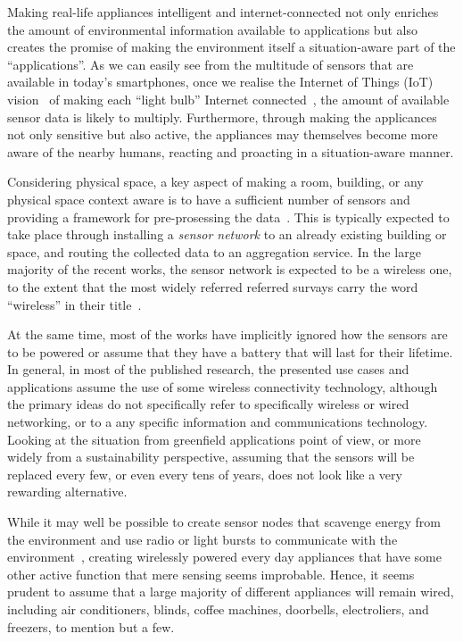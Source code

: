 \documentclass[draft,a4paper]{siamltex}
\begin{document}
Making real-life appliances intelligent and internet-connected not
only enriches the amount of environmental information available to
applications but also creates the promise of making the environment
itself a situation-aware part of the ``applications''.  As we can
easily see from the multitude of sensors that are available in today's
smartphones, once we realise the Internet of Things (IoT)
vision~\cite{Atzori20102787} of making each ``light bulb'' Internet
connected~\cite{cerf1997next}, the amount of available sensor data is
likely to multiply.  Furthermore, through making the applicances not
only sensitive but also active, the appliances may themselves become
more aware of the nearby humans, reacting and proacting in a
situation-aware manner.

Considering physical space, a key aspect of making a room, building,
or any physical space context aware is to have a sufficient number of
sensors and providing a framework for pre-prosessing the
data~\cite{Baldauf2007a}.  This is typically expected to take place
through installing a {\it sensor network} to an already existing
building or space, and routing the collected data to an aggregation
service.  In the large majority of the recent works, the sensor
network is expected to be a wireless one, to the extent that the most
widely referred referred survays carry the word ``wireless'' in their
title~\cite{akyildiz2002wireless, akkaya2005survey}.

At the same time, most of the works have implicitly ignored how the
sensors are to be powered or assume that they have a battery that will
last for their lifetime.  In general, in most of the published
research, the presented use cases and applications assume the use of
some wireless connectivity technology, although the primary ideas do
not specifically refer to specifically wireless or wired networking,
or to a any specific information and communications technology.
Looking at the situation from greenfield applications point of view,
or more widely from a sustainability perspective, assuming that the
sensors will be replaced every few, or even every tens of years, does
not look like a very rewarding alternative.

While it may well be possible to create sensor nodes that scavenge
energy from the environment and use radio or light bursts to
communicate with the environment~\cite{wang2010toward}, creating
wirelessly powered every day appliances that have some other active
function that mere sensing seems improbable.  Hence, it seems prudent
to assume that a large majority of different appliances will remain
wired, including air conditioners, blinds, coffee machines, doorbells,
electroliers, and freezers, to mention but a few.
\end{document}
